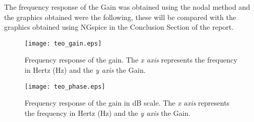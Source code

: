 The frequency response of the Gain was obtained using the nodal method and the graphics obtained were the following, these will be compared with the graphics obtained using NGspice in the Conclusion Section of the report.

\begin{figure}[H] \centering
	\texttt{[image: teo\_gain.eps]}
	\caption{Frequency response of the gain. The \textit{x axis} represents the frequency in Hertz (Hz) and the \textit{y axis} the Gain.}
	\label{fig:teo_gain}
\end{figure}

\begin{figure}[H] \centering
	\texttt{[image: teo\_phase.eps]}
	\caption {Frequency response of the gain in dB scale. The \textit{x axis} represents the frequency in Hertz (Hz) and the \textit{y axis} the Gain.}
	\label{fig:teo_gaindB}
\end{figure}
